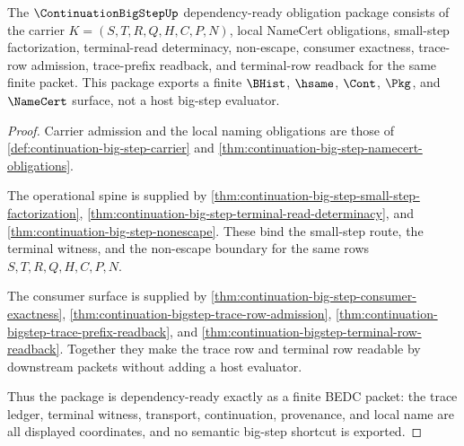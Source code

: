 \begin{theorem}
\label{thm:continuation-bigstep-smallstep-closure-package}
The $\ContinuationBigStepUp$ dependency-ready obligation package consists of
the carrier $K=(S,T,R,Q,H,C,P,N)$, local NameCert obligations, small-step
factorization, terminal-read determinacy, non-escape, consumer exactness,
trace-row admission, trace-prefix readback, and terminal-row readback for the
same finite packet. This package exports a finite $\BHist$, $\hsame$, $\Cont$,
$\Pkg$, and $\NameCert$ surface, not a host big-step evaluator.
\end{theorem}
\begin{proof}
Carrier admission and the local naming obligations are those of
\autoref{def:continuation-big-step-carrier} and
\autoref{thm:continuation-big-step-namecert-obligations}.

The operational spine is supplied by
\autoref{thm:continuation-big-step-small-step-factorization},
\autoref{thm:continuation-big-step-terminal-read-determinacy}, and
\autoref{thm:continuation-big-step-nonescape}. These bind the small-step route,
the terminal witness, and the non-escape boundary for the same rows
$S,T,R,Q,H,C,P,N$.

The consumer surface is supplied by
\autoref{thm:continuation-big-step-consumer-exactness},
\autoref{thm:continuation-bigstep-trace-row-admission},
\autoref{thm:continuation-bigstep-trace-prefix-readback}, and
\autoref{thm:continuation-bigstep-terminal-row-readback}. Together they make
the trace row and terminal row readable by downstream packets without adding a
host evaluator.

Thus the package is dependency-ready exactly as a finite BEDC packet: the trace
ledger, terminal witness, transport, continuation, provenance, and local name
are all displayed coordinates, and no semantic big-step shortcut is exported.
\end{proof}


